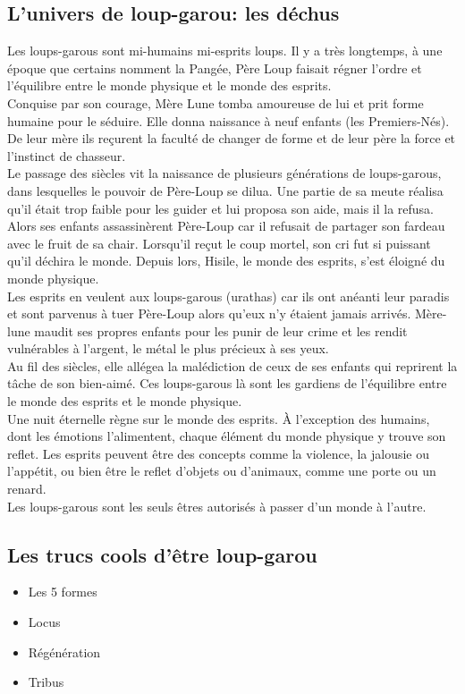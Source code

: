 \documentclass[oneside,12pt]{book}
\begin{document}
\begin{flushleft}
        \section{L'univers de loup-garou: les déchus}
       Les loups-garous sont mi-humains mi-esprits loups. 
       Il y a très longtemps, à une époque que certains nomment la Pangée, 
       Père Loup faisait régner l'ordre et l’équilibre entre le monde physique et le monde des esprits.\\ 
       Conquise par son courage, Mère Lune tomba amoureuse de lui et prit forme humaine pour le séduire. 
       Elle donna naissance à neuf enfants (les Premiers-Nés). 
       De leur mère ils reçurent la faculté de changer de forme et de leur père la force et l'instinct de chasseur.\\ 
       Le passage des siècles vit la naissance de plusieurs générations de loups-garous, 
       dans lesquelles le pouvoir de Père-Loup se dilua. 
       Une partie de sa meute réalisa qu'il était trop faible pour les guider et lui proposa son aide, mais il la refusa. Alors ses enfants assassinèrent Père-Loup car il refusait de partager son fardeau avec le fruit de sa chair. Lorsqu’il reçut le coup mortel, son cri fut si puissant qu’il déchira le monde. Depuis lors, Hisile, le monde des esprits, s’est éloigné du monde physique.\\ Les esprits en veulent aux loups-garous (urathas) car ils ont anéanti leur paradis et sont parvenus à tuer Père-Loup alors qu’eux n’y étaient jamais arrivés. Mère-lune maudit ses propres enfants pour les punir de leur crime et les rendit vulnérables à l'argent, le métal le plus précieux à ses yeux.\\ 
       Au fil des siècles, elle allégea la malédiction de ceux de ses enfants qui reprirent la tâche de son bien-aimé. 
       Ces loups-garous là sont les gardiens de l’équilibre entre le monde des esprits et le monde physique.  \\
Une nuit éternelle règne sur le monde des esprits. 
À l’exception des humains, dont les émotions l’alimentent, chaque élément du monde physique y trouve son reflet. 
Les esprits peuvent être des concepts comme la violence, la jalousie ou l'appétit, ou bien être le reflet d’objets ou d’animaux, comme une porte ou un renard.\\ Les loups-garous sont les seuls êtres autorisés à passer d’un monde à l’autre.
\subsection{Les trucs cools d'être loup-garou}
\begin{itemize}
\item Les 5 formes 
\item Locus
\item Régénération
\item Tribus
\end{itemize}


\end{flushleft}
\end{document}
